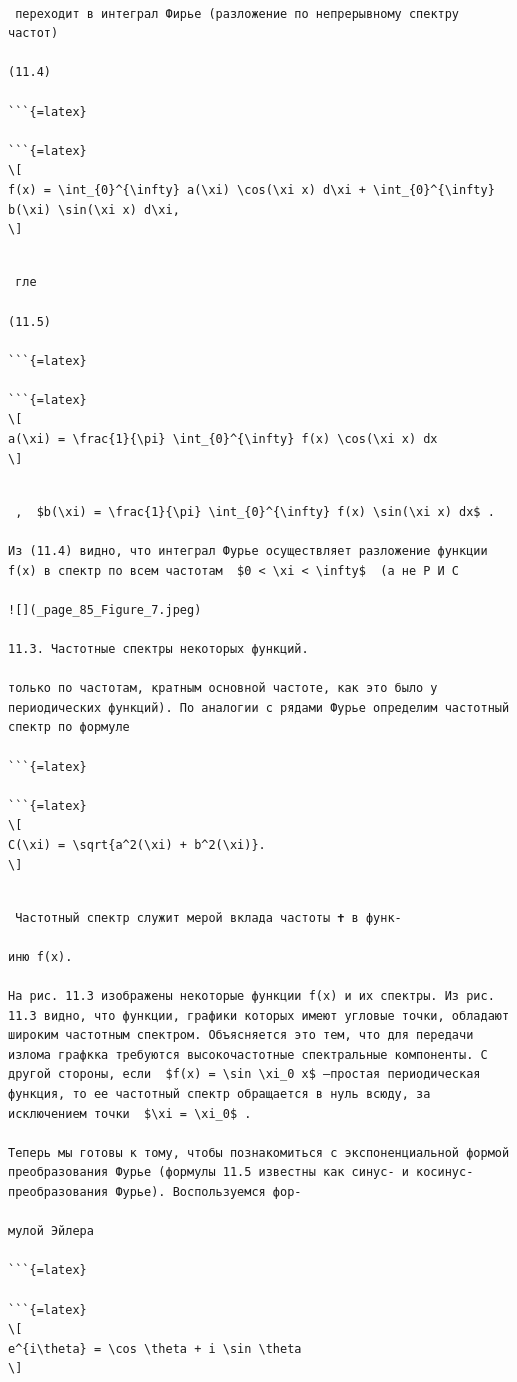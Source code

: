 \documentclass[
  ukrainian,
]{article}
\begin{document}
\begin{verbatim}

 переходит в интеграл Фирье (разложение по непрерывному спектру частот)

(11.4) 

```{=latex}

```{=latex}
\[
f(x) = \int_{0}^{\infty} a(\xi) \cos(\xi x) d\xi + \int_{0}^{\infty} b(\xi) \sin(\xi x) d\xi,
\]
\end{verbatim}

\begin{verbatim}

 гле

(11.5) 

```{=latex}

```{=latex}
\[
a(\xi) = \frac{1}{\pi} \int_{0}^{\infty} f(x) \cos(\xi x) dx
\]
\end{verbatim}

\begin{verbatim}

 ,  $b(\xi) = \frac{1}{\pi} \int_{0}^{\infty} f(x) \sin(\xi x) dx$ .

Из (11.4) видно, что интеграл Фурье осуществляет разложение функции f(x) в спектр по всем частотам  $0 < \xi < \infty$  (а не Р И С

![](_page_85_Figure_7.jpeg)

11.3. Частотные спектры некоторых функций.

только по частотам, кратным основной частоте, как это было у периодических функций). По аналогии с рядами Фурье определим частотный спектр по формуле

```{=latex}

```{=latex}
\[
C(\xi) = \sqrt{a^2(\xi) + b^2(\xi)}.
\]
\end{verbatim}

\begin{verbatim}

 Частотный спектр служит мерой вклада частоты 🕇 в функ-

иню f(x).

На рис. 11.3 изображены некоторые функции f(x) и их спектры. Из рис. 11.3 видно, что функции, графики которых имеют угловые точки, обладают широким частотным спектром. Объясняется это тем, что для передачи излома графкка требуются высокочастотные спектральные компоненты. С другой стороны, если  $f(x) = \sin \xi_0 x$ —простая периодическая функция, то ее частотный спектр обращается в нуль всюду, за исключением точки  $\xi = \xi_0$ .

Теперь мы готовы к тому, чтобы познакомиться с экспоненциальной формой преобразования Фурье (формулы 11.5 известны как синус- и косинус-преобразования Фурье). Воспользуемся фор-

мулой Эйлера

```{=latex}

```{=latex}
\[
e^{i\theta} = \cos \theta + i \sin \theta
\]
\end{verbatim}
\end{document}
